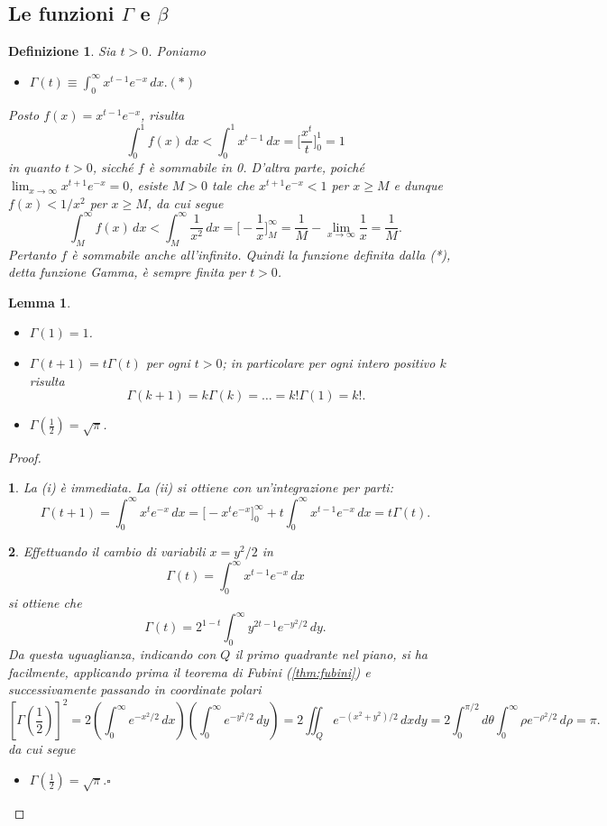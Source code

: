 \documentclass[a4paper,10pt,openright,oneside]{book}
\theoremstyle{theoremstyle}
\newtheorem{lemma}[teorema]{Lemma}
\theoremstyle{theoremstylewoheader}
\theoremstyle{theoremstyle}
\newtheorem{definizione}[teorema]{Definizione}
\theoremstyle{proofsecstyle}
\newtheorem{proofsec}{}
\theoremstyle{nonumberplain}
\newtheorem{proof}{Dim.}
\renewcommand{\qedsymbol}{\ensuremath{\square}}
\newcommand{\mymath}[2]{\begin{itemize}%
  \item[]\hfill\hbox{}\ensuremath{\displaystyle #1}\hfill\ensuremath{\displaystyle #2}%
  \end{itemize}}
\begin{document}
\subsection{Le funzioni $\Gamma$ e $\beta$}

\begin{definizione}
\label{def:funzione_gamma}
Sia $t > 0$. Poniamo \mymath{\Gamma(t) \equiv \int_0^\infty x^{t-1}e^{-x}\, dx.}{(*)} Posto $f(x) = x^{t-1}e^{-x}$, risulta
\[
\int_0^1 f(x)\, dx < \int_0^1 x^{t-1}\, dx = \Bigg[\frac{x^t}{t}\Bigg]_0^1 = 1
\]
in quanto $t > 0$, sicché $f$ è sommabile in 0. D'altra parte, poiché $\lim_{x \to \infty} x^{t+1}e^{-x} = 0$, esiste $M > 0$ tale che $x^{t+1}e^{-x} < 1$ per $x \ge M$ e dunque $f(x) < 1/x^2$ per $x \ge M$, da cui segue
\[
\int_M^\infty f(x)\, dx < \int_M^\infty \frac{1}{x^2}\, dx = \Bigg[-\frac{1}{x}\Bigg]_M^\infty = \frac{1}{M} - \lim_{x \to \infty} \frac{1}{x} = \frac{1}{M}.
\]
Pertanto $f$ è sommabile anche all'infinito. Quindi la funzione definita dalla (*), detta \emph{funzione Gamma}, è sempre finita per $t > 0$.
\end{definizione}

\begin{lemma}
\label{pro:proprieta_funzione_gamma}
\mbox{}
\begin{itemize}
\item[(i)] $\Gamma(1) = 1$.
\item[(ii)] $\Gamma(t+1) = t\Gamma(t)$ per ogni $t > 0$; in particolare per ogni intero positivo $k$ risulta
\[
\Gamma(k+1) = k\Gamma(k) = \ldots = k!\Gamma(1) = k!.
\]
\item[(iii)] $\Gamma\left(\frac{1}{2}\right) = \sqrt{\pi}$.
\end{itemize}
\end{lemma}

\begin{proof}
\begin{proofsec}
La (i) è immediata. La (ii) si ottiene con un'integrazione per parti:
\[
\Gamma(t+1) = \int_0^\infty x^t e^{-x}\, dx = \Big[-x^t e^{-x}\Big]_0^\infty + t\int_0^\infty x^{t-1} e^{-x}\, dx = t\Gamma(t).
\]
\end{proofsec}

\begin{proofsec}
Effettuando il cambio di variabili $x = y^2/2$ in 
\[
\Gamma(t) = \int_0^\infty x^{t-1}e^{-x}\, dx
\]
si ottiene che
\[
\Gamma(t) = 2^{1-t} \int_0^\infty y^{2t-1} e^{-y^2/2}\, dy.
\]
Da questa uguaglianza, indicando con $Q$ il primo quadrante nel piano, si ha facilmente, applicando prima il teorema di Fubini (\ref{thm:fubini}) e successivamente passando in coordinate polari
\[
\left[\Gamma\left(\frac{1}{2}\right)\right]^2 = 2\left(\int_0^\infty e^{-x^2/2}\, dx\right)\left(\int_0^\infty e^{-y^2/2}\, dy\right) = 2\iint_Q e^{-(x^2+y^2)/2}\, dxdy = 2\int_0^{\pi/2} d\theta \int_0^\infty \rho e^{-\rho^2/2}\, d\rho = \pi.
\]
da cui segue
\mymath{\Gamma\left(\frac{1}{2}\right) = \sqrt{\pi}.}{\qedsymbol}
\end{proofsec}
\end{proof}
\end{document}
